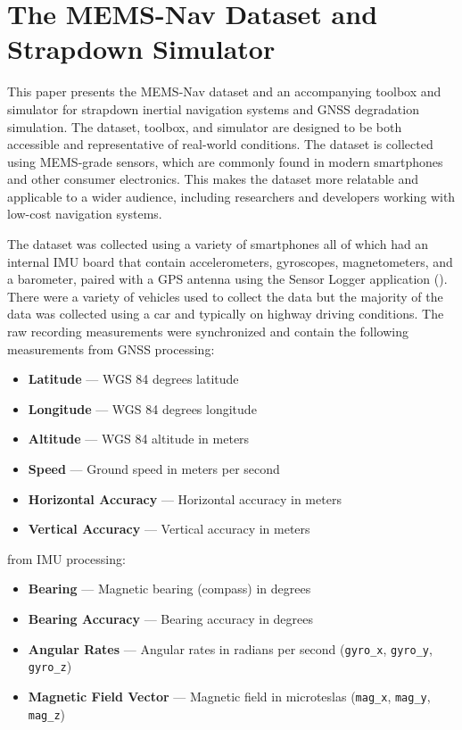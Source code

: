 \documentclass[Afour,sageh,times]{sagej}
\begin{document}
\section{The MEMS-Nav Dataset and Strapdown Simulator}
This paper presents the MEMS-Nav dataset and an accompanying toolbox and simulator for strapdown inertial navigation systems and GNSS degradation simulation. The dataset, toolbox, and simulator are designed to be both accessible and representative of real-world conditions. The dataset is collected using MEMS-grade sensors, which are commonly found in modern smartphones and other consumer electronics. This makes the dataset more relatable and applicable to a wider audience, including researchers and developers working with low-cost navigation systems.

The dataset was collected using a variety of smartphones all of which had an internal IMU board that contain accelerometers, gyroscopes, magnetometers, and a barometer, paired with a GPS antenna using the Sensor Logger application (\cite{awesome-sensor-logger}). There were a variety of vehicles used to collect the data but the majority of the data was collected using a car and typically on highway driving conditions. The raw recording measurements were synchronized and contain the following measurements from GNSS processing:\begin{itemize}
  \item \textbf{Latitude} --- WGS 84 degrees latitude
  \item \textbf{Longitude} --- WGS 84 degrees longitude 
  \item \textbf{Altitude} --- WGS 84 altitude in meters
  \item \textbf{Speed} --- Ground speed in meters per second
  \item \textbf{Horizontal Accuracy} --- Horizontal accuracy in meters
  \item \textbf{Vertical Accuracy} --- Vertical accuracy in meters
\end{itemize} from IMU processing: \begin{itemize}
  \item \textbf{Bearing} --- Magnetic bearing (compass) in degrees
  \item \textbf{Bearing Accuracy} --- Bearing accuracy in degrees
  \item \textbf{Angular Rates} --- Angular rates in radians per second (\verb|gyro_x|, \verb|gyro_y|, \verb|gyro_z|)
  \item \textbf{Magnetic Field Vector} --- Magnetic field in microteslas (\verb|mag_x|, \verb|mag_y|, \verb|mag_z|)

\end{itemize}
\end{document}
